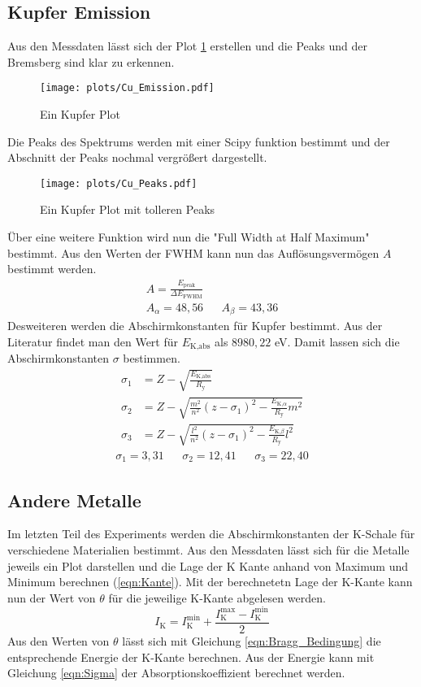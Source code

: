 \subsection{Kupfer Emission}
Aus den Messdaten lässt sich der Plot \ref{fig:Cu_Emission} erstellen und die Peaks und der Bremsberg sind klar zu erkennen.
\begin{figure}
    \centering
    \texttt{[image: plots/Cu\_Emission.pdf]}
    \caption{Ein Kupfer Plot}
    \label{fig:Cu_Emission}
\end{figure}
Die Peaks des Spektrums werden mit einer Scipy funktion bestimmt und der Abschnitt der Peaks nochmal vergrößert dargestellt.
\begin{figure}
    \centering
    \texttt{[image: plots/Cu\_Peaks.pdf]}
    \caption{Ein Kupfer Plot mit tolleren Peaks}
    \label{fig:Cu_Peaks}
\end{figure}
Über eine weitere Funktion wird nun die "Full Width at Half Maximum" bestimmt.
Aus den Werten der FWHM kann nun das Auflösungsvermögen $A$ bestimmt werden.
\begin{align}
    A = \frac{E_{\text{peak}}}{\Delta E_{\text{FWHM}}} \nonumber\\
    A_{\alpha}= 48,56 && A_{\beta} = 43,36
\end{align}
Desweiteren werden die Abschirmkonstanten für Kupfer bestimmt.
Aus der Literatur findet man den Wert für $E_{\text{K,abs}}$ als $8980,22$ eV.
Damit lassen sich die Abschirmkonstanten $\sigma$ bestimmen.
\begin{align*}
    \sigma_1 &= Z-\sqrt{\frac{E_{\text{K,abs}}}{R_{\text{y}}}} \\
    \sigma_2 &= Z-\sqrt{ \frac{m^2}{n^2}\left(z-\sigma_1\right)^2- \frac{E_{\text{K,}\alpha}}{R_{\text{y}}}m^2 } \\
    \sigma_3 &= Z-\sqrt{ \frac{l^2}{n^2}\left(z-\sigma_1\right)^2- \frac{E_{\text{K,}\beta}}{R_{\text{y}}}l^2 }
\end{align*}
\begin{align}
    \sigma_1 = 3,31 && \sigma_2 = 12,41 && \sigma_3 = 22,40 
\end{align}

\subsection{Andere Metalle}
Im letzten Teil des Experiments werden die Abschirmkonstanten der K-Schale für verschiedene Materialien bestimmt.
Aus den Messdaten lässt sich für die Metalle jeweils ein Plot darstellen und die Lage der K Kante anhand von Maximum und Minimum berechnen (\ref{eqn:Kante}).
Mit der berechnetetn Lage der K-Kante kann nun der Wert von $\theta$ für die jeweilige K-Kante abgelesen werden. 
\begin{equation}
    I_{\text{K}}= I_{\text{K}}^{\text{min}} + \frac{I_{\text{K}}^{\text{max}}-I_{\text{K}}^{\text{min}}}{2} \label{eqn:Kante}
\end{equation}
Aus den Werten von $\theta$ lässt sich mit Gleichung \ref{eqn:Bragg_Bedingung} die entsprechende Energie der K-Kante berechnen.
Aus der Energie kann mit Gleichung \ref{eqn:Sigma} der Absorptionskoeffizient berechnet werden.
